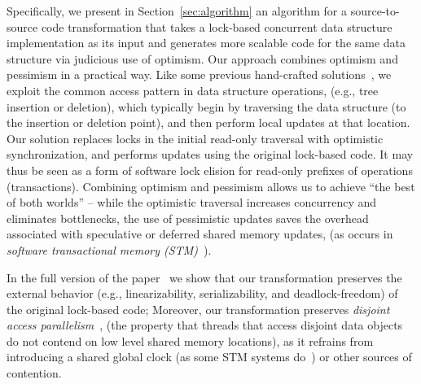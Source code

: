 Specifically, we present in Section~\ref{sec:algorithm} an algorithm for a source-to-source
code transformation that takes a lock-based concurrent data structure implementation as its input
and generates more scalable code for the same data structure via judicious use of optimism.
Our approach combines optimism and pessimism in a practical way.
Like some previous hand-crafted solutions~\cite{LazyList}, 
we exploit the common access pattern in data structure operations,
(e.g., tree insertion or deletion), which typically begin by traversing the data structure (to the insertion or deletion point), and then perform local updates at that location.
Our solution replaces locks in the initial read-only traversal with optimistic synchronization, and performs updates using the original lock-based code. It
may thus be seen as a form of software lock elision for read-only prefixes of operations (transactions).
%
Combining optimism and pessimism allows us to achieve ``the best of both worlds'' -- 
while the
optimistic traversal increases concurrency and eliminates bottlenecks,
the use of pessimistic updates saves the overhead associated with speculative or deferred shared
memory updates, (as occurs in \emph{software transactional memory (STM)}~\cite{HLR:SLCA2010}).
%


In the full version of the paper~\cite{fullversion} we show that our transformation preserves the external behavior (e.g., linearizability, serializability, and deadlock-freedom) of the original lock-based code; %
Moreover, our transformation preserves 
\emph{disjoint access parallelism}~\cite{Israeli:1994:DIS:197917.198079}, (the property that threads 
that access disjoint data objects do not contend on low level shared memory locations), as it
refrains from introducing a shared global clock (as some STM systems do~\cite{DBLP:conf/eurosys/ShalevS06}) or other sources of contention. 



